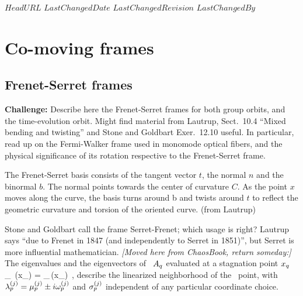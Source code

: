 \ifsvnmulti
 \svnidlong
 {$HeadURL$}
 {$LastChangedDate$}
 {$LastChangedRevision$} {$LastChangedBy$}
\fi

\renewcommand{\ssp}{x}            %

\chapter{Co-moving frames}
\label{c:comoving}


\section{Frenet-Serret frames}
\label{sect:FrenSerr}

\textbf{Challenge:}
Describe here the Frenet-Serret  frames for both group orbits, and
the time-evolution orbit. Might find material from Lautrup,
Sect.~10.4 ``Mixed bending and twisting'' and Stone and
Goldbart Exer.~12.10 useful. In particular, read up on the
Fermi-Walker frame used in monomode optical fibers, and the physical
significance of its rotation respective to the Frenet-Serret frame.

{}{
The Frenet-Serret basis consists of the tangent vector $t$, the normal
$n$ and the binormal $b$. The normal points towards the center of
curvature $C$. As the point $x$ moves along the curve, the basis turns
around b and twists around $t$ to reflect the geometric curvature and
torsion of the oriented curve.
(from Lautrup)
}{}

Stone and Goldbart call the frame Serret-Frenet; which usage is right?
Lautrup says ``due to Frenet in 1847 (and independently to Serret in
1851)'', but Serret is more influential mathematician.
                                    \toCB
\emph{[Moved here from ChaosBook, return someday:]}
The eigenvalues and the eigen\-vectors of \stabmat\  ${A}_q$
evaluated at a stagnation point $\ssp_\stagn$
\beq
{\Mvar}_\stagn \, \jEigvec[j](\ssp_\stagn)
   = \eigExp[j]_\stagn \,\jEigvec[j] (\ssp_\stagn)
\,,
describe the linearized neighborhood of the \eqv\ point, with
$\eigExp[j]_p = \eigRe[j]_p \pm i\eigIm[j]_p$ and $\sigma_{p}^{(j)}$
independent of any particular coordinate choice.



